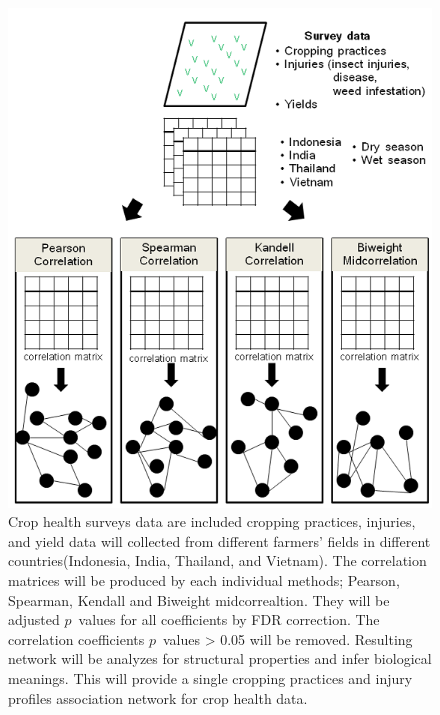 \begin{landscape}

\begin{figure}
\centering
\includegraphics[width = 6in]{pipeline}
\caption[Network method for characterizing interaction between injury profiles and cropping practices using correlation measures]{Crop health surveys data are included cropping practices, injuries, and yield data will collected from different farmers' fields in different countries(Indonesia, India, Thailand, and Vietnam). The correlation matrices will be produced by each individual methods; Pearson, Spearman, Kendall and Biweight midcorrealtion. They will be adjusted $p$~values for all coefficients by FDR correction. The correlation coefficients $p$~values > 0.05 will be removed. Resulting network will be  analyzes for structural properties and infer biological meanings. This will provide a single cropping practices and injury profiles association network for crop health data.}
\end{figure}
\end{landscape}

